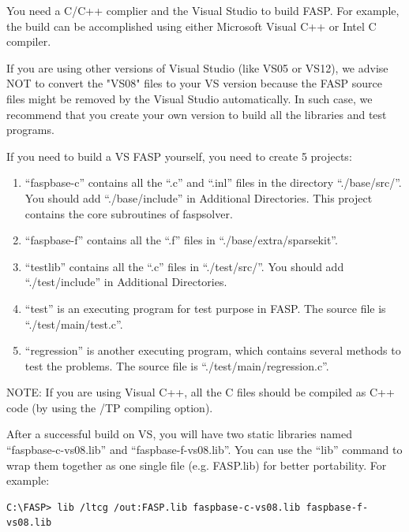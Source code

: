 \documentclass[11pt]{memoir}
\begin{document}
\begin{snugshade}\noindent
  You need a C/C++ complier and the Visual Studio to build FASP. For
  example, the build can be accomplished using either Microsoft Visual
  C++ or Intel C compiler. %
\end{snugshade}

\begin{snugshade}\noindent
  If you are using other versions of Visual Studio (like VS05 or
  VS12), we advise NOT to convert the "VS08" files to your VS version
  because the FASP source files might be {\color{red}removed} by the
  Visual Studio automatically. In such case, we recommend that you
  create your own version to build all the libraries and test
  programs.
\end{snugshade}

If you need to build a VS FASP yourself, you need to create 5 projects:
\begin{enumerate}
\item ``faspbase-c'' contains all the ``.c'' and ``.inl'' files in the
  directory ``./base/src/''. You should add ``./base/include'' in
  Additional Directories. This project contains the core subroutines
  of faspsolver.
\item ``faspbase-f'' contains all the ``.f'' files in
  ``./base/extra/sparsekit''.
\item ``testlib'' contains all the ``.c'' files in
  ``./test/src/''. You should add ``./test/include'' in Additional
  Directories.
\item ``test'' is an executing program for test purpose in FASP. The
  source file is ``./test/main/test.c''.
\item ``regression'' is another executing program, which contains
  several methods to test the problems. The source file is
  ``./test/main/regression.c''.
\end{enumerate}

\begin{snugshade}\noindent
  NOTE: If you are using Visual C++, all the C files should be
  compiled as C++ code (by using the /TP compiling option).
\end{snugshade}

After a successful build on VS, you will have two static libraries
named ``faspbase-c-vs08.lib'' and ``faspbase-f-vs08.lib''. You can use
the ``lib'' command to wrap them together as one single file
(e.g. FASP.lib) for better portability. For example:
%
\begin{lstlisting}[numbers=none]
C:\FASP> lib /ltcg /out:FASP.lib faspbase-c-vs08.lib faspbase-f-vs08.lib
\end{lstlisting}
%
\end{document}
